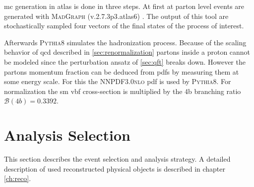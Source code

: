 \ac{mc} generation in \ac{atlas} is done in three steps. At first at parton level events are generated with \textsc{MadGraph} (v.2.7.3p3.atlas6) \citep{alwall2014automated}. The output of this tool are stochastically sampled four vectors of the final states of the process of interest.

Afterwards \textsc{Pythia8} \citep{Sjostrand:2014zea} simulates the hadronization process. Because of the scaling behavior of \ac{qcd} described in \ref{sec:renormalization} partons inside a proton cannot be modeled since the perturbation ansatz of \ref{sec:qft} breaks down. However the partons momentum fraction can be deduced from \acp{pdf} by measuring them at some energy scale. For this the \textsc{NNPDF3.0nlo} \ac{pdf} is used by \textsc{Pythia8}. For normalization the \ac{sm} \ac{vbf} cross-section is multiplied by the 4b branching ratio $\mathcal{B}(4b)=0.3392$.



\section{Analysis Selection}
This section describes the event selection and analysis strategy. A detailed description of used reconstructed physical objects is described in chapter \ref{ch:reco}. 

